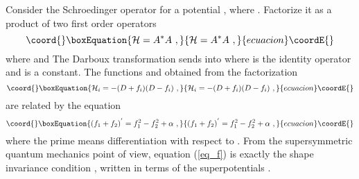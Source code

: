 \documentclass[a4paper,11pt]{article}
\begin{document}
Consider the Schroedinger operator for a potential \coordHE{}, \coordHE{}
where \coordHE{}. Factorize it as a product of two first order operators
\begin{equation}\coord{}\boxEquation{
\label{Sr}
{\cal H}=A^{*}A ~,
}{
{\cal H}=A^{*}A ~,
}{ecuacion}\coordE{}\end{equation}
where \coordHE{} and \coordHE{}
The Darboux transformation sends \coordHE{} into \coordHE{}
where \coordHE{} is the identity operator and \myHighlight{$\alpha $}\coordHE{} is a constant. The functions \coordHE{} and
\coordHE{} obtained from the factorization
\begin{equation}\coord{}\boxEquation{
\label{fac}
{\cal H}_i=-(D+f_i)(D-f_i) ~,
}{
{\cal H}_i=-(D+f_i)(D-f_i) ~,
}{ecuacion}\coordE{}\end{equation}
are related by the equation
\begin{equation}\coord{}\boxEquation{
\label{eq_f}
(f_1+f_2)^{'}=f_1^2-f_2^2+\alpha ~,
}{
(f_1+f_2)^{'}=f_1^2-f_2^2+\alpha ~,
}{ecuacion}\coordE{}\end{equation}
where the prime means differentiation with respect to \coordHE{}.
From the supersymmetric quantum mechanics point of view, equation
(\ref{eq_f}) is exactly the shape invariance condition \cite{Cooper},
written in terms of the superpotentials \coordHE{} .
\end{document}
